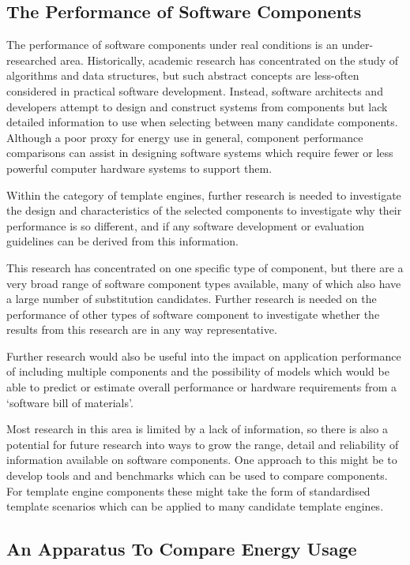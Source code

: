 \subsection{The Performance of Software Components}

The performance of software components under real conditions is an under-researched area. Historically, academic research has concentrated on the study of algorithms and data structures, but such abstract concepts are less-often considered in practical software development. Instead, software architects and developers attempt to design and construct systems from components but lack detailed information to use when selecting between many candidate components. Although a poor proxy for energy use in general, component performance comparisons can assist in designing software systems which require fewer or less powerful computer hardware systems to support them.

Within the category of template engines, further research is needed to investigate the design and characteristics of the selected components to investigate why their performance is so different, and if any software development or evaluation guidelines can be derived from this information.

This research has concentrated on one specific type of component, but there are a very broad range of software component types available, many of which also have a large number of substitution candidates. Further research is needed on the performance of other types of software component to investigate whether the results from this research are in any way representative.

Further research would also be useful into the impact on application performance of including multiple components and the possibility of models which would be able to predict or estimate overall performance or hardware requirements from a `software bill of materials'.

Most research in this area is limited by a lack of information, so there is also a potential for future research into ways to grow the range, detail and reliability of information available on software components. One approach to this might be to develop tools and and benchmarks which can be used to compare components. For template engine components these might take the form of standardised template scenarios which can be applied to many candidate template engines.

\subsection{An Apparatus To Compare Energy Usage}


